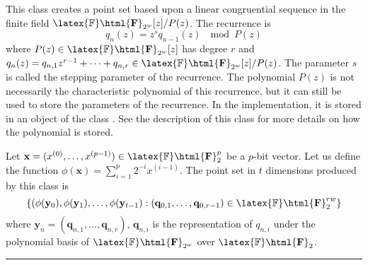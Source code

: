 
This class creates a point set based upon
a linear congruential sequence in the finite field
 $\latex{\mathbb{F}}\html{\mathbf{F}}_{2^w}[z]/P(z)$.
The recurrence is
$$
q_n(z) = z^s q_{n-1}(z)\ \mod P(z)
$$
where $P(z)\in \latex{\mathbb{F}}\html{\mathbf{F}}_{2^w}[z]$ has degree $r$ and
$q_n(z) = q_{n,1} z^{r-1} + \cdots + q_{n,r} \in
 \latex{\mathbb{F}}\html{\mathbf{F}}_{2^w}[z]/P(z)$.
The parameter $s$ is
called the stepping parameter of the recurrence.
The polynomial $P(z)$ is not necessarily the characteristic polynomial
of this recurrence, but it can still be used to store the parameters of
 the recurrence.
In the implementation, it is stored in an object of the class
 .  See the description
of this class for more details on how the polynomial
is stored.


Let $\mathbf{x} = (x^{(0)}, \ldots, x^{(p-1)}) \in
 \latex{\mathbb{F}}\html{\mathbf{F}}_{2}^p$ be a $p$-bit vector.
Let us define the function $\phi(\mathbf{x}) =
\sum_{i=1}^{p} 2^{-i} x^{(i-1)}$.
The point set in $t$ dimensions produced by this class is
$$
\{ (\phi(\mathbf{y}_0),\phi(\mathbf{y}_1),\ldots,\phi(\mathbf{y}_{t-1}):
 (\mathbf{q}_{0,1},\ldots,\mathbf{q}_{0,r-1})\in
 \latex{\mathbb{F}}\html{\mathbf{F}}_{2}^{rw}\}
$$
where $\mathbf{y}_n = (\mathbf{q}_{n,1},\ldots,\mathbf{q}_{n,r})$,
 $\mathbf{q}_{n,i}$
 is the representation of $q_{n,i}$ under the polynomial basis of
$\latex{\mathbb{F}}\html{\mathbf{F}}_{2^w}$ over
 $\latex{\mathbb{F}}\html{\mathbf{F}}_2$.

\bigskip\hrule\bigskip

